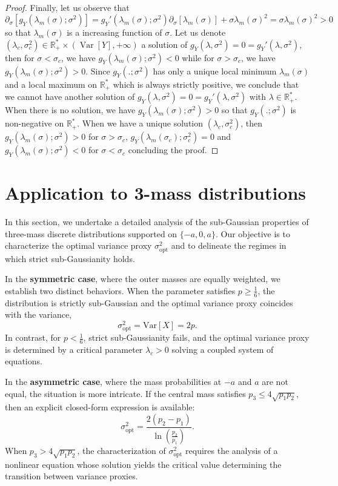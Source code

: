 \documentclass[a4paper, 10pt]{article}
\newcommand{\beq}{\begin{equation}}
\newcommand{\eeq}{\end{equation}}
\theoremstyle{definition}
\begin{document}
\begin{proof}
Finally, let us observe that
\beq  \partial_\sigma[g_Y(\lambda_m(\sigma);\sigma^2)]=g_Y'(\lambda_m(\sigma);\sigma^2) \partial_\sigma[\lambda_m(\sigma)]+ \sigma\lambda_m(\sigma)^2=\sigma\lambda_m(\sigma)^2>0\eeq
so that $\lambda_m(\sigma)$ is a increasing function of $\sigma$. Let us denote $(\lambda_c,\sigma_c^2)\in \mathbb{R}_+^*\times \left(\operatorname{Var}[Y],+\infty\right)$ a solution of $g_Y(\lambda,\sigma^2)=0=g_Y'(\lambda,\sigma^2)$, then for $\sigma<\sigma_c$, we have $g_Y(\lambda_m(\sigma);\sigma^2)<0$ while for $\sigma>\sigma_c$, we have $g_Y(\lambda_m(\sigma);\sigma^2)>0$. Since $g_Y(.;\sigma^2)$ has only a unique local minimum $\lambda_m(\sigma)$ and a local maximum on $\mathbb{R}_+^*$ which is always strictly positive, we conclude that we cannot have another solution of $g_Y(\lambda,\sigma^2)=0=g_Y'(\lambda,\sigma^2)$ with $\lambda\in \mathbb{R}_+^*$. When there is no solution, we have $g_Y(\lambda_m(\sigma);\sigma^2)>0$ so that $g_Y(.;\sigma^2)$ is non-negative on $\mathbb{R}_+^*$. When we have a unique solution $(\lambda_c,\sigma_c^2)$, then $g_Y(\lambda_m(\sigma);\sigma^2)>0$ for $\sigma>\sigma_c$, $g_Y(\lambda_m(\sigma_c);\sigma_c^2)=0$ and $g_Y(\lambda_m(\sigma);\sigma^2)<0$ for $\sigma<\sigma_c$ concluding the proof.
\end{proof}

\section{Application to 3-mass distributions}\label{sec:3-mass}

In this section, we undertake a detailed analysis of the sub-Gaussian properties of three-mass discrete distributions supported on $\{-a,0,a\}$. Our objective is to characterize the optimal variance proxy $\sigma^2_{\mathrm{opt}}$ and to delineate the regimes in which strict sub-Gaussianity holds.  

In the \textbf{symmetric case}, where the outer masses are equally weighted, we establish two distinct behaviors. When the parameter satisfies $p \geq \tfrac{1}{6}$, the distribution is strictly sub-Gaussian and the optimal variance proxy coincides with the variance,
\[
\sigma^2_{\mathrm{opt}} = \mathrm{Var}[X] = 2p.
\]
In contrast, for $p < \tfrac{1}{6}$, strict sub-Gaussianity fails, and the optimal variance proxy is determined by a critical parameter $\lambda_c > 0$ solving a coupled system of equations.  

In the \textbf{asymmetric case}, where the mass probabilities at $-a$ and $a$ are not equal, the situation is more intricate. If the central mass satisfies $p_3 \leq 4\sqrt{p_1p_2}$, then an explicit closed-form expression is available:
\[
\sigma^2_{\mathrm{opt}} = \frac{2(p_2 - p_1)}{\ln\!\left(\tfrac{p_2}{p_1}\right)}.
\]
When $p_3 > 4\sqrt{p_1p_2}$, the characterization of $\sigma^2_{\mathrm{opt}}$ requires the analysis of a nonlinear equation whose solution yields the critical value determining the transition between variance proxies.  
 
\end{document}
